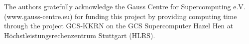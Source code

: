\documentclass[graybox]{svmult}
\begin{document}
%
\begin{acknowledgement}
The authors gratefully acknowledge the Gauss Centre for Supercomputing e.V. (www.gauss-centre.eu)
for funding this project by providing computing time through the project GCS-KKRN on the GCS Supercomputer
Hazel Hen at Höchstleistungsrechenzentrum Stuttgart (HLRS).
\end{acknowledgement}



\end{document}
